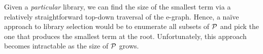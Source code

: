 Given a \emph{particular} library,
  we can find the size of the smallest term
  via a relatively straightforward top-down traversal of the e-graph.
%
Hence, a na\"ive approach to library selection
  would be to enumerate all subsets of $\mathcal{P}$
  and pick the one that produces the smallest term at the root. 
%
Unfortunately, this approach becomes intractable as the size of $\mathcal{P}$ grows.

